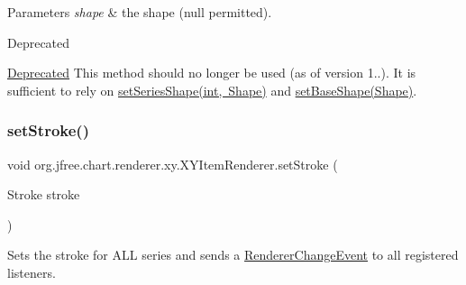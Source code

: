 \begin{DoxyParams}{Parameters}
{\em shape} & the shape ({\ttfamily null} permitted).\\
\hline
\end{DoxyParams}
\begin{DoxyRefDesc}{Deprecated}
\item[\mbox{\hyperlink{deprecated__deprecated000223}{Deprecated}}]This method should no longer be used (as of version 1..). It is sufficient to rely on \mbox{\hyperlink{interfaceorg_1_1jfree_1_1chart_1_1renderer_1_1xy_1_1_x_y_item_renderer_af6269fff1133f74297f63ef2fa5beac6}{set\+Series\+Shape(int, Shape)}} and \mbox{\hyperlink{interfaceorg_1_1jfree_1_1chart_1_1renderer_1_1xy_1_1_x_y_item_renderer_ae37032e410d9bb4b4349732c8c72dcb4}{set\+Base\+Shape(\+Shape)}}. \end{DoxyRefDesc}
\mbox{\label{interfaceorg_1_1jfree_1_1chart_1_1renderer_1_1xy_1_1_x_y_item_renderer_a473ce909b6895b827ae52a038a1cde4a}} 
\subsubsection{\texorpdfstring{set\+Stroke()}{setStroke()}}
{\footnotesize\ttfamily void org.\+jfree.\+chart.\+renderer.\+xy.\+X\+Y\+Item\+Renderer.\+set\+Stroke (\begin{DoxyParamCaption}\item[{Stroke}]{stroke }\end{DoxyParamCaption})}

Sets the stroke for A\+LL series and sends a \mbox{\hyperlink{}{Renderer\+Change\+Event}} to all registered listeners.


